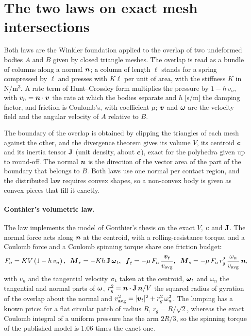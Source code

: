 \section{The two laws on exact mesh intersections}\label{sh:laws}

Both laws are the Winkler foundation applied to the overlap of two undeformed bodies $A$ and
$B$ given by closed triangle meshes. The overlap is read as a bundle of columns along a normal
$\boldsymbol{n}$; a column of length $\ell$ stands for a spring compressed by $\ell$ and presses with
$K\ell$ per unit of area, with the stiffness $K$ in N/m$^3$. A rate term of Hunt--Crossley form
multiplies the pressure by $1 - h\,v_n$, with $v_n = \boldsymbol{n}\cdot\boldsymbol{v}$ the rate at which the bodies
separate and $h$ [s/m] the damping factor, and friction is Coulomb's, with coefficient $\mu$;
$\boldsymbol{v}$ and $\boldsymbol{\omega}$ are the velocity field and the angular velocity of $A$ relative to $B$.

The boundary of the overlap is obtained by clipping the triangles of each mesh against the
other, and the divergence theorem gives its volume $V$, its centroid $\boldsymbol{c}$ and its inertia
tensor $\mathbf{J}$ (unit density, about $\boldsymbol{c}$), exact for the polyhedra given up to
round-off. The normal $\boldsymbol{n}$ is the direction
of the vector area of the part of the boundary that belongs to $B$. Both laws use one normal
per contact region, and the distributed law requires convex shapes, so a non-convex body is
given as convex pieces that fill it exactly.

\paragraph{Gonthier's volumetric law.} The law  implements the model of
Gonthier's thesis \cite{Gonthier2007thesis} on the exact $V$, $\boldsymbol{c}$ and $\mathbf{J}$. The
normal force acts along $\boldsymbol{n}$ at the centroid, with a rolling-resistance torque, and a Coulomb
force and a Coulomb spinning torque share one friction budget:
\begin{equation}
  F_n = K V \left(1 - h\,v_n\right), \;\;
  \boldsymbol{M}_r = -K h\, \mathbf{J}\, \boldsymbol{\omega}_t , \;\;
  \boldsymbol{f}_t = -\mu\,F_n\,\frac{\boldsymbol{v}_t}{v_\mathrm{avg}}, \;\;
  \boldsymbol{M}_s = -\mu\,F_n\, r_g^2\,\frac{\omega_n}{v_\mathrm{avg}}\,\boldsymbol{n} ,
  \label{sh:gonthier}
\end{equation}
with $v_n$ and the tangential velocity $\boldsymbol{v}_t$ taken at the centroid, $\boldsymbol{\omega}_t$ and
$\omega_n$ the tangential and normal parts of $\boldsymbol{\omega}$, $r_g^2 = \boldsymbol{n}\cdot\mathbf{J}\,\boldsymbol{n}/V$ the squared
radius of gyration of the overlap about the normal and
$v_\mathrm{avg}^2 = |\boldsymbol{v}_t|^2 + r_g^2\,\omega_n^2$. The lumping has a known price: for a flat
circular patch of radius $R$, $r_g = R/\sqrt2$, whereas the exact Coulomb integral of a uniform
pressure has the arm $2R/3$, so the spinning torque of the published model is 1.06 times the
exact one.

